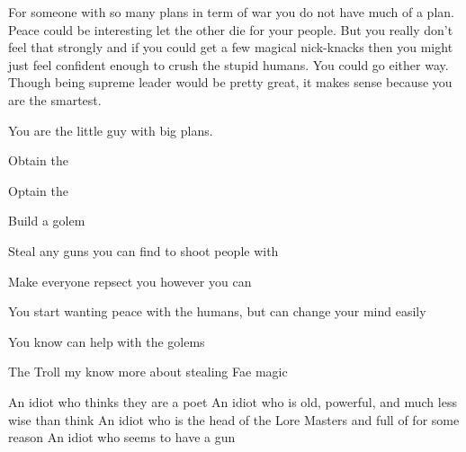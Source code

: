 \documentclass[char]{guildcamp2}
\begin{document}
For someone with so many plans in term of war you do not have much of a plan. Peace could be interesting let the other die for your people. But you really don't feel that strongly and if you could get a few magical nick-knacks then you might just feel confident enough to crush the stupid humans. You could go either way. Though being supreme leader would be pretty great, it makes sense because you are the smartest.

You are the little guy with big plans.

\begin{itemz}[Goals]
  \item Obtain the \iOrbofPower{}
  \item Optain the \iTearofMagic{}
  \item Build a golem
	\item Steal any guns you can find to shoot people with
	\item Make everyone repsect you however you can
\end{itemz}

\begin{itemz}[Notes]
  \item You start wanting peace with the humans, but can change your mind easily 
  \item You know \cOnyx{} can help with the golems
	\item The Troll my know more about stealing Fae magic
\end{itemz}


\begin{contacts}
  \contact{\cTroll{}} An idiot who thinks they are a poet
  \contact{\cOnyx{}} An idiot who is old, powerful, and much less wise than \cOnyx{\they} think
	\contact{\cVampire{}} An idiot who is the head of the Lore Masters and full of \cVampire{\themself} for some reason
	\contact{\cCleric{}} An idiot who seems to have a gun
\end{contacts}
\end{document}
